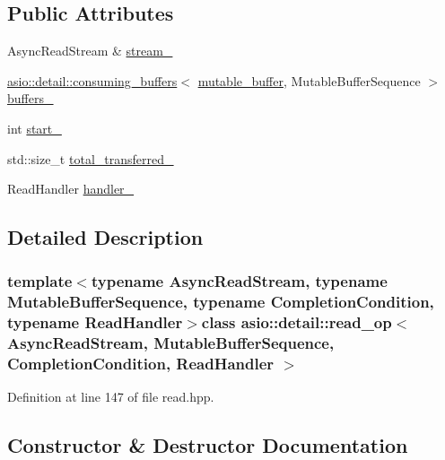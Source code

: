 \subsection*{Public Attributes}
\begin{DoxyCompactItemize}
\item 
Async\+Read\+Stream \& \hyperlink{classasio_1_1detail_1_1read__op_a4dee3c0e9c3d6ab702df6ded4bd1573b}{stream\+\_\+}
\item 
\hyperlink{classasio_1_1detail_1_1consuming__buffers}{asio\+::detail\+::consuming\+\_\+buffers}$<$ \hyperlink{classasio_1_1mutable__buffer}{mutable\+\_\+buffer}, Mutable\+Buffer\+Sequence $>$ \hyperlink{classasio_1_1detail_1_1read__op_a71375abf74b7e1a1fffaa23c770a6e74}{buffers\+\_\+}
\item 
int \hyperlink{classasio_1_1detail_1_1read__op_a5ca22131fe58d48d2d61baf61c0f7de5}{start\+\_\+}
\item 
std\+::size\+\_\+t \hyperlink{classasio_1_1detail_1_1read__op_a1eeb44229a1aea0b34bbe79da9f746d4}{total\+\_\+transferred\+\_\+}
\item 
Read\+Handler \hyperlink{classasio_1_1detail_1_1read__op_a0306b644536860cbf0ef90aeef05725b}{handler\+\_\+}
\end{DoxyCompactItemize}


\subsection{Detailed Description}
\subsubsection*{template$<$typename Async\+Read\+Stream, typename Mutable\+Buffer\+Sequence, typename Completion\+Condition, typename Read\+Handler$>$class asio\+::detail\+::read\+\_\+op$<$ Async\+Read\+Stream, Mutable\+Buffer\+Sequence, Completion\+Condition, Read\+Handler $>$}



Definition at line 147 of file read.\+hpp.



\subsection{Constructor \& Destructor Documentation}
\hypertarget{classasio_1_1detail_1_1read__op_ac145e93f691e7eed0379ac75e87b9d33}{}
